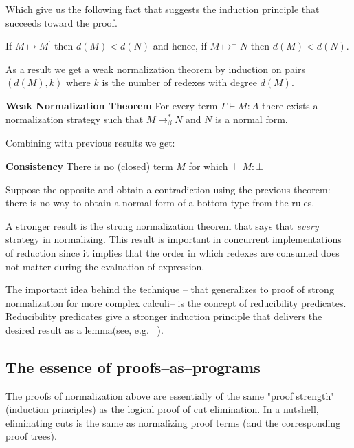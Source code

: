 Which give us the following fact that suggests the induction principle that succeeds toward the proof.
\begin{mdframed}
	\begin{theorem}
If $M\mapsto M^{\prime}$ then $d(M)<d(N)$ and hence, if $M\mapsto^{+} N$ then $d(M)<d(N)$.
\end{theorem}
\end{mdframed}
As a result we get a weak  normalization theorem by induction on pairs $(d(M),k)$ where $k$ is the number of redexes with degree $d(M)$.
\begin{mdframed}
\begin{theorem}
	\textbf{Weak Normalization Theorem}
For every term $\Gamma\vdash M:A$ there exists a normalization strategy 
such that $M\mapsto_{\beta}^{*}N$ and $N$ is a normal form.
\end{theorem}
\end{mdframed} 

Combining with previous results we get:
\begin{theorem}
\begin{mdframed}
\textbf{Consistency}
There is no (closed) term $M$ for which $\vdash M:\bot$ 
\end{mdframed}
\end{theorem}
 Suppose the opposite and obtain a contradiction using the previous theorem: there is no way to obtain a normal form of a bottom type from the rules.  
 
 A stronger result is the strong normalization theorem that says that \textit{every} strategy 
 in normalizing. This result is important in concurrent implementations of reduction since 
 it implies that the order in which redexes are consumed does 
 not matter during the evaluation of  expression. 
 
 The important idea behind the technique -- that generalizes to proof of 
 strong normalization for more complex calculi-- is the concept of  reducibility predicates. 
 Reducibility predicates give a stronger induction principle that delivers the desired 
 result as a lemma(see, e.g. ~\cite{prawitz1971ideas}). 
 

\subsection{The essence of proofs--as--programs }
The proofs of normalization above are essentially of the same "proof strength" (induction principles) as the logical proof of cut elimination. In a nutshell, eliminating cuts is the same as normalizing proof terms (and the corresponding proof trees).

